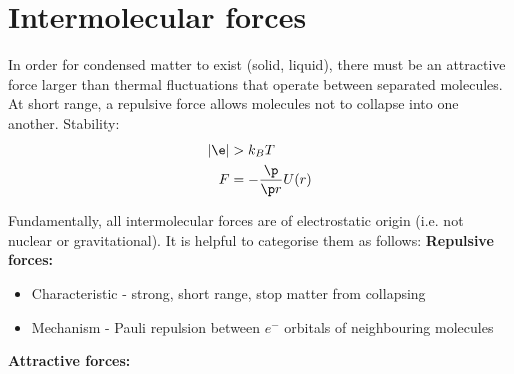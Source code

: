 \documentclass[a4paper, 11pt, normalem]{report}
\begin{document}
\section{Intermolecular forces}
In order for condensed matter to exist (solid, liquid), there must be an attractive force larger than thermal fluctuations that operate between separated molecules.
At short range, a repulsive force allows molecules not to collapse into one another.
Stability:
\begin{align}
    |\e| &> k_BT \\
    F &= -\frac{\p}{\p r} U(r)
\end{align}
\vspace{-20pt}
\begin{figure}[H]
    \centering
\end{figure}
\vspace{-80pt}
Fundamentally, all intermolecular forces are of electrostatic origin (i.e. not nuclear or gravitational).
It is helpful to categorise them as follows:
\textbf{Repulsive forces:}
\begin{itemize}
    \item Characteristic - strong, short range, stop matter from collapsing
    \item Mechanism - Pauli repulsion between $e^-$ orbitals of neighbouring molecules
\end{itemize}
\textbf{Attractive forces:}
\end{document}
